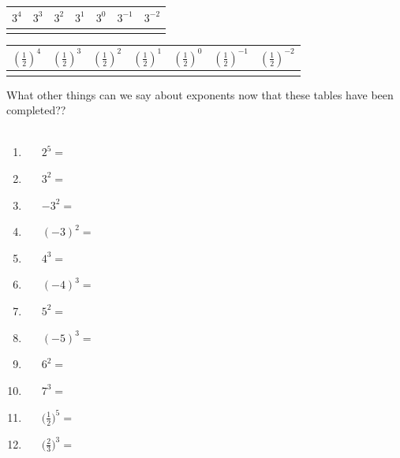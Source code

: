 \documentclass[a4paper,12pt]{article}
\begin{document}
\begin{center}
	\begin{tabular}{| >{\centering\arraybackslash}m{\len} | >{\centering\arraybackslash}m{\len}  | >{\centering\arraybackslash}m{\len} | >{\centering\arraybackslash}m{\len} |>{\centering\arraybackslash}m{\len} |>{\centering\arraybackslash}m{\len} |>{\centering\arraybackslash}m{\len} |}\hline
		$3^{4}$ & $3^{3}$ & $3^{2}$&$3^{1}$& $3^{0}$ & $3^{-1}$&$3^{-2}$\\\hline
		&&&&&&\\\hline\end{tabular}
\end{center}

\begin{center}
	\begin{tabular}{| >{\centering\arraybackslash}m{\len} | >{\centering\arraybackslash}m{\len}  | >{\centering\arraybackslash}m{\len} | >{\centering\arraybackslash}m{\len} |>{\centering\arraybackslash}m{\len} |>{\centering\arraybackslash}m{\len} |>{\centering\arraybackslash}m{\len} |}\hline
		$(\frac{1}{2})^{4}$ & $(\frac{1}{2})^{3}$ & $(\frac{1}{2})^{2}$&$(\frac{1}{2})^{1}$& $(\frac{1}{2})^{0}$ & $(\frac{1}{2})^{-1}$&$(\frac{1}{2})^{-2}$\\\hline
		&&&&&&\\\hline\end{tabular}
\end{center}
What other things can we say about exponents now that these tables have been completed??\\\\
\begin{tcolorbox}[colback=red!0!white, colframe=gray ,title=\subsubsection{Work out the following exponents.}\label{exp1}]
	\begin{multicols}{3}
		\begin{enumerate}[label=\footnotesize \roman*)]
			\item~~~$\displaystyle 2^5=$
			\item~~~$\displaystyle 3^2=$
			\item~~~$\displaystyle -3^2=$
			\item~~~$\displaystyle (-3)^2=$
			\item~~~$\displaystyle 4^3=$
			\item~~~$\displaystyle (-4)^3=$
			\item~~~$\displaystyle 5^2=$
			\item~~~$\displaystyle (-5)^3=$
			\item~~~$\displaystyle 6^2=$
			\item~~~$\displaystyle 7^3=$
			\item~~~$\displaystyle \Big(\frac{1}{2}\Big)^{5}=$
			\item~~~$\displaystyle \Big(\frac{2}{3}\Big)^{3}=$
		\end{enumerate}
	\end{multicols}
\end{tcolorbox}\vspace{0.75cm}
\end{document}
